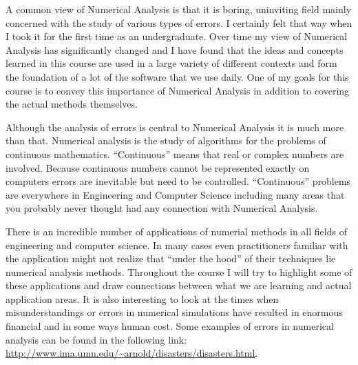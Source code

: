 \documentclass [titlepage,12pt,letter] {article}
\begin{document}
A common view of Numerical Analysis is that it is boring, uninviting
field mainly concerned with the study of various types of errors. I
certainly felt that way when I took it for the first time as an
undergraduate. Over time my view of Numerical Analysis has
significantly changed and I have found that the ideas and concepts
learned in this course are used in a large variety of different
contexts and form the foundation of a lot of the software that we use
daily. One of my goals for this course is to convey this importance 
of Numerical Analysis in addition to covering the actual methods
themselves. 

Although the analysis of errors is central to Numerical Analysis it is
much more than that. Numerical analysis is the study of algorithms for
the problems of continuous mathematics.
``Continuous'' means that real or complex numbers are involved.
Because continuous numbers cannot be represented exactly on computers
errors are inevitable but need to be controlled.  ``Continuous''
problems are everywhere in Engineering and Computer Science including many areas that
you probably never thought had any connection with Numerical Analysis.

There is an incredible number of applications of numerial methods in
all fields of engineering and computer science. In many cases even
practitioners familiar with the application might not realize that
``under the hood'' of their techniques lie numerical analysis
methods. Throughout the course I will try to highlight some of these
applications and draw connections between what we are learning and
actual application areas. It is also interesting to look at the times
when misunderstandings or errors in numerical simulations have
resulted in enormous financial and in some ways human cost. Some 
examples of errors in numerical analysis can be found in the following
link: \url{http://www.ima.umn.edu/~arnold/disasters/disasters.html}. 
\end{document}
